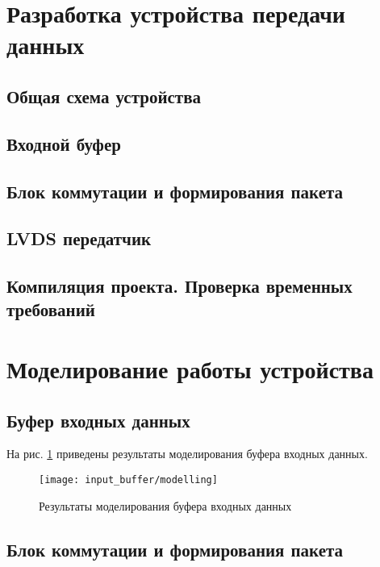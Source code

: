 \tableofcontents

\newpage

\section{Разработка устройства передачи данных}

\subsection{Общая схема устройства}

\subsection{Входной буфер}

\subsection{Блок коммутации и формирования пакета}

\subsection{LVDS передатчик}

\subsection{Компиляция проекта. Проверка временных требований}

\newpage

\section{Моделирование работы устройства}

\subsection{Буфер входных данных}

На рис. \ref{fig:input_buffer_modelling} приведены результаты моделирования буфера входных данных.
\begin{figure}[H]
	\centering
	\texttt{[image: input\_buffer/modelling]}
	\caption{Результаты моделирования буфера входных данных}
	\label{fig:input_buffer_modelling}
\end{figure}

\subsection{Блок коммутации и формирования пакета}

